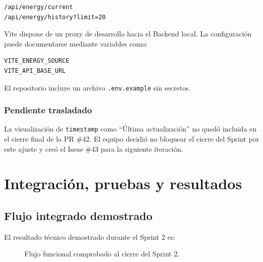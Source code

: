 \documentclass[11pt,a4paper,oneside]{report}
\begin{document}
\begin{verbatim}
/api/energy/current
/api/energy/history?limit=20
\end{verbatim}

Vite dispone de un proxy de desarrollo hacia el Backend local. La configuración puede documentarse mediante variables como:

\begin{verbatim}
VITE_ENERGY_SOURCE
VITE_API_BASE_URL
\end{verbatim}

El repositorio incluye un archivo \texttt{.env.example} sin secretos.

\subsection{Pendiente trasladado}

La visualización de \texttt{timestamp} como ``Última actualización'' no quedó incluida en el cierre final de la PR \#42. El equipo decidió no bloquear el cierre del Sprint por este ajuste y creó el Issue \#43 para la siguiente iteración.


\chapter{Integración, pruebas y resultados}

\section{Flujo integrado demostrado}

El resultado técnico demostrado durante el Sprint 2 es:

\begin{figure}[H]
\centering
{}
\caption{Flujo funcional comprobado al cierre del Sprint 2.}
\end{figure}
\end{document}

